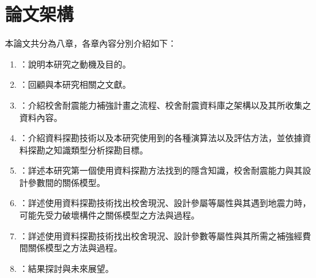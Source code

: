 \section{論文架構}

本論文共分為八章，各章內容分別介紹如下：

\begin{enumerate}
\item \textbf{}：說明本研究之動機及目的。
\item \textbf{}：回顧與本研究相關之文獻。
\item \textbf{}：介紹校舍耐震能力補強計畫之流程、校舍耐震資料庫之架構以及其所收集之資料內容。
\item \textbf{}：介紹資料探勘技術以及本研究使用到的各種演算法以及評估方法，並依據資料探勘之知識類型分析探勘目標。
\item \textbf{}：詳述本研究第一個使用資料探勘方法找到的隱含知識，校舍耐震能力與其設計參數間的關係模型。
\item \textbf{}：詳述使用資料探勘技術找出校舍現況、設計參屬等屬性與其遇到地震力時，可能先受力破壞構件之關係模型之方法與過程。
\item \textbf{}：詳述使用資料探勘技術找出校舍現況、設計參數等屬性與其所需之補強經費間關係模型之方法與過程。
\item \textbf{}：結果探討與未來展望。
\end{enumerate}



